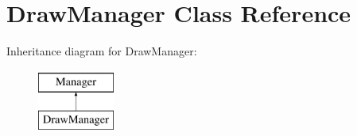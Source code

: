 \hypertarget{class_draw_manager}{\section{Draw\+Manager Class Reference}
\label{class_draw_manager}
}
Inheritance diagram for Draw\+Manager\+:\begin{figure}[H]
\begin{center}
\leavevmode
\includegraphics[height=2.000000cm]{class_draw_manager}
\end{center}
\end{figure}
